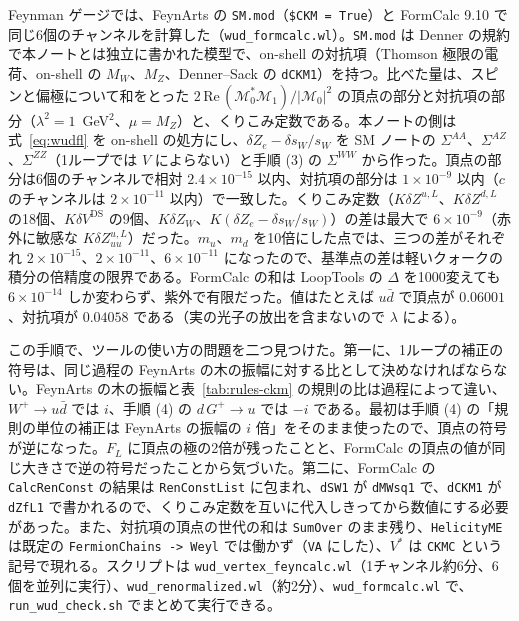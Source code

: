 \documentclass[a4paper,10pt]{ltjsarticle}
\newcommand{\sw}{s_W}
\newcommand{\re}{\mathrm{Re}\,}
\begin{document}
Feynman ゲージでは、FeynArts の \texttt{SM.mod}（\texttt{\$CKM = True}）と FormCalc 9.10 で同じ6個のチャンネルを計算した（\texttt{wud\_formcalc.wl}）。\texttt{SM.mod} は Denner の規約で本ノートとは独立に書かれた模型で、on-shell の対抗項（Thomson 極限の電荷、on-shell の $M_W$、$M_Z$、Denner--Sack の \texttt{dCKM1}）を持つ。比べた量は、スピンと偏極について和をとった $2\,\re(\mathcal M_0^*\mathcal M_1)/|\mathcal M_0|^2$ の頂点の部分と対抗項の部分（$\lambda^2=1$~GeV$^2$、$\mu=M_Z$）と、くりこみ定数である。本ノートの側は式~\eqref{eq:wudfl} を on-shell の処方にし、$\delta Z_e-\delta\sw/\sw$ を SM ノートの $\Sigma^{AA}$、$\Sigma^{AZ}$、$\Sigma^{ZZ}$（1ループでは $V$ によらない）と手順 (3) の $\Sigma^{WW}$ から作った。頂点の部分は6個のチャンネルで相対 $2.4\times10^{-15}$ 以内、対抗項の部分は $1\times10^{-9}$ 以内（$c$ のチャンネルは $2\times10^{-11}$ 以内）で一致した。くりこみ定数（$K\delta Z^{u,L}$、$K\delta Z^{d,L}$ の18個、$K\delta V^{\mathrm{DS}}$ の9個、$K\delta Z_W$、$K(\delta Z_e-\delta\sw/\sw)$）の差は最大で $6\times10^{-9}$（赤外に敏感な $K\delta Z^{u,L}_{uu}$）だった。$m_u$、$m_d$ を10倍にした点では、三つの差がそれぞれ $2\times10^{-15}$、$2\times10^{-11}$、$6\times10^{-11}$ になったので、基準点の差は軽いクォークの積分の倍精度の限界である。FormCalc の和は LoopTools の $\Delta$ を1000変えても $6\times10^{-14}$ しか変わらず、紫外で有限だった。値はたとえば $u\bar d$ で頂点が $0.06001$、対抗項が $0.04058$ である（実の光子の放出を含まないので $\lambda$ による）。

この手順で、ツールの使い方の問題を二つ見つけた。第一に、1ループの補正の符号は、同じ過程の FeynArts の木の振幅に対する比として決めなければならない。FeynArts の木の振幅と表~\ref{tab:rules-ckm} の規則の比は過程によって違い、$W^+\to u\bar d$ では $i$、手順 (4) の $d\,G^+\to u$ では $-i$ である。最初は手順 (4) の「規則の単位の補正は FeynArts の振幅の $i$ 倍」をそのまま使ったので、頂点の符号が逆になった。$F_L$ に頂点の極の2倍が残ったことと、FormCalc の頂点の値が同じ大きさで逆の符号だったことから気づいた。第二に、FormCalc の \texttt{CalcRenConst} の結果は \texttt{RenConstList} に包まれ、\texttt{dSW1} が \texttt{dMWsq1} で、\texttt{dCKM1} が \texttt{dZfL1} で書かれるので、くりこみ定数を互いに代入しきってから数値にする必要があった。また、対抗項の頂点の世代の和は \texttt{SumOver} のまま残り、\texttt{HelicityME} は既定の \texttt{FermionChains -> Weyl} では働かず（\texttt{VA} にした）、$V^*$ は \texttt{CKMC} という記号で現れる。スクリプトは \texttt{wud\_vertex\_feyncalc.wl}（1チャンネル約6分、6個を並列に実行）、\texttt{wud\_renormalized.wl}（約2分）、\texttt{wud\_formcalc.wl} で、\texttt{run\_wud\_check.sh} でまとめて実行できる。
\end{document}
